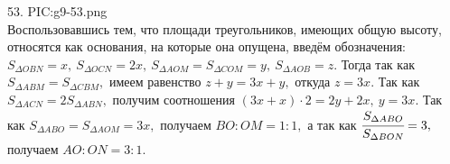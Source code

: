 53. {{PIC:g9-53.png}}\\
Воспользовавшись тем, что площади треугольников, имеющих общую высоту, относятся как основания, на которые она опущена, введём обозначения: $S_{\Delta OBN}=x,\ S_{\Delta OCN}=2x,\ S_{\Delta AOM}=S_{\Delta COM}=y,\ S_{\Delta AOB}=z.$ Тогда так как $S_{\Delta ABM}=S_{\Delta CBM},$ имеем равенство $z+y=3x+y,$ откуда $z=3x.$ Так как $S_{\Delta ACN}=2S_{\Delta ABN},$ получим соотношения $(3x+x)\cdot2=2y+2x,\ y=3x.$ Так как $S_{\Delta ABO}=S_{\Delta AOM}=3x,$ получаем $BO:OM=1:1,$ а так как $\cfrac{S_{\Delta ABO}}{S_{\Delta BON}}=3,$ получаем $AO:ON=3:1.$\\
